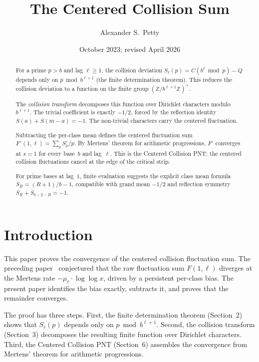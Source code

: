 \documentclass[12pt]{amsart}
\title{The Centered Collision Sum}
\author{Alexander S.\ Petty}
\date{October 2023; revised April 2026}
\theoremstyle{definition}
\theoremstyle{remark}
\begin{document}
\begin{abstract}
For a prime $p > b$ and lag $\ell \ge 1$, the collision
deviation $S_{\ell}(p) = C(b^{\ell} \bmod p) - Q$ depends
only on $p \bmod b^{\ell+1}$ (the finite determination
theorem). This reduces the collision deviation to a function
on the finite group
$(\mathbb{Z}/b^{\ell+1}\mathbb{Z})^{\times}$.

The \emph{collision transform} decomposes this function over
Dirichlet characters modulo~$b^{\ell+1}$. The trivial
coefficient is exactly $-1/2$, forced by the reflection
identity $S(a) + S(m{-}a) = -1$. The non-trivial characters
carry the centered fluctuation.

Subtracting the per-class mean defines the centered
fluctuation sum $F^{\circ}(1, \ell) = \sum_p S^{\circ}_p / p$.
By Mertens' theorem for arithmetic progressions, $F^{\circ}$
converges at $s = 1$ for every base~$b$ and lag~$\ell$. This
is the Centered Collision PNT: the centered collision
fluctuations cancel at the edge of the critical strip.

For prime bases at lag~$1$, finite evaluation suggests the
explicit class mean formula
$\overline{S}_R = (R{+}1)/b - 1$, compatible with grand mean
$-1/2$ and reflection symmetry
$\overline{S}_R + \overline{S}_{b-2-R} = -1$.
\end{abstract}
\maketitle

\section{Introduction}

This paper proves the convergence of the centered collision
fluctuation sum. The preceding paper~\cite{paper-fluct}
conjectured that the raw fluctuation sum $F(1, \ell)$ diverges
at the Mertens rate $-\mu_{\ell} \cdot \log\log x$, driven by
a persistent per-class bias. The present paper identifies the
bias exactly, subtracts it, and proves that the remainder
converges.

The proof has three steps. First, the finite determination
theorem (Section~2) shows that $S_{\ell}(p)$ depends only on
$p \bmod b^{\ell+1}$. Second, the collision transform
(Section~3) decomposes the resulting finite function over
Dirichlet characters. Third, the Centered Collision PNT
(Section~6) assembles the convergence from Mertens' theorem
for arithmetic progressions.
\end{document}
